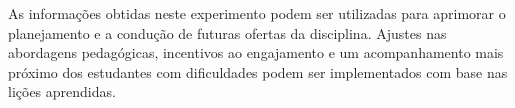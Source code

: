 As informações obtidas neste experimento podem ser utilizadas para aprimorar o planejamento e a condução de futuras ofertas da disciplina. Ajustes nas abordagens pedagógicas, incentivos ao engajamento e um acompanhamento mais próximo dos estudantes com dificuldades podem ser implementados com base nas lições aprendidas.
